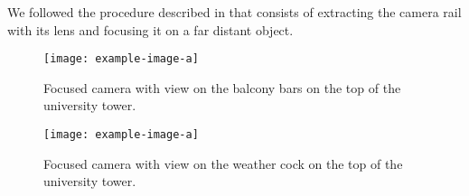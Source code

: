 We followed the procedure described in \cite{Hertlein2017} that consists of
extracting the camera rail with its lens and focusing it on a far distant
object.

\begin{figure}[ht]
  \centering
  \texttt{[image: example-image-a]}
    \caption{Focused camera with view on the balcony bars on the top of the
    university tower.}
    \label{fig:camerafocus:balcony}
  \endminipage
  \hfill
    \texttt{[image: example-image-a]}
    \caption{Focused camera with view on the weather cock on the top of the
    university tower.}
    \label{fig:camerafocus:cock}
  \endminipage
  \hfill
\end{figure}

